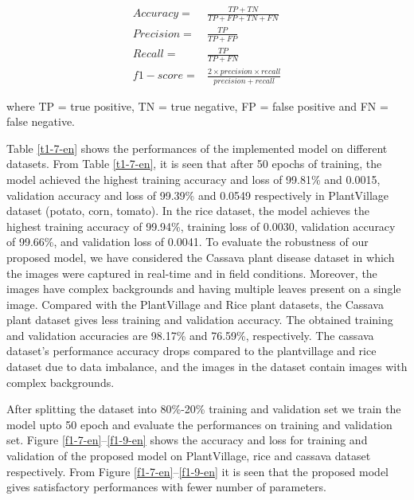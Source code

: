 \begin{align*} Accuracy=&\frac {TP+TN}{TP+FP+TN+FN} \tag{3}\\ Precision=&\frac {TP}{TP+FP} \tag{4}\\ Recall=&\frac {TP}{TP+FN} \tag{5}\\ f1-score=&\frac {2\times precision\times recall }{precision + recall}\tag{6}\end{align*}

where TP = true positive, TN = true negative, FP = false positive and FN = false negative.

Table \ref{t1-7-en} shows the performances of the implemented model on different datasets. From Table \ref{t1-7-en}, it is seen that after 50 epochs of training, the model achieved the highest training accuracy and loss of 99.81\% and 0.0015, validation accuracy and loss of 99.39\% and 0.0549 respectively in PlantVillage dataset (potato, corn, tomato). In the rice dataset, the model achieves the highest training accuracy of 99.94\%, training loss of 0.0030, validation accuracy of 99.66\%, and validation loss of 0.0041. To evaluate the robustness of our proposed model, we have considered the Cassava plant disease dataset in which the images were captured in real-time and in field conditions. Moreover, the images have complex backgrounds and having multiple leaves present on a single image. Compared with the PlantVillage and Rice plant datasets, the Cassava plant dataset gives less training and validation accuracy. The obtained training and validation accuracies are 98.17\% and 76.59\%, respectively. The cassava dataset’s performance accuracy drops compared to the plantvillage and rice dataset due to data imbalance, and the images in the dataset contain images with complex backgrounds.


After splitting the dataset into 80\%-20\% training and validation set we train the model upto 50 epoch and evaluate the performances on training and validation set. Figure \ref{f1-7-en}–​\ref{f1-9-en} shows the accuracy and loss for training and validation of the proposed model on PlantVillage, rice and cassava dataset respectively. From Figure \ref{f1-7-en}–​\ref{f1-9-en} it is seen that the proposed model gives satisfactory performances with fewer number of parameters.


